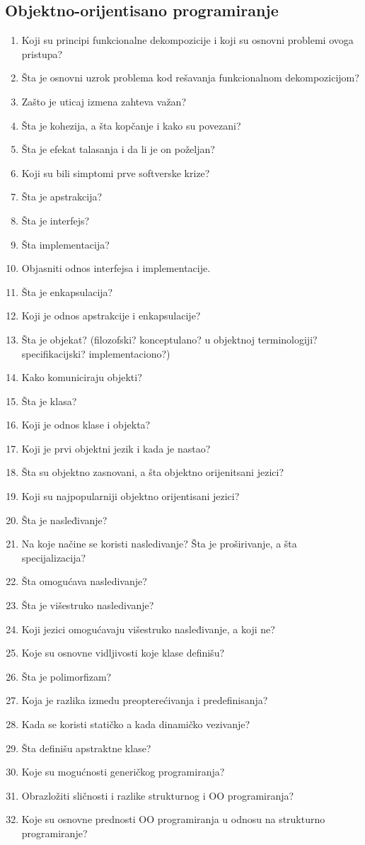 \documentclass[main.tex]{subfiles}
\begin{document}
\begin{multicols}{2}
\subsection{Objektno-orijentisano programiranje}
\begin{enumerate}
\item  Koji su principi funkcionalne dekompozicije i koji su osnovni problemi ovoga pristupa?
\item Šta je osnovni uzrok problema kod rešavanja funkcionalnom dekompozicijom?
\item Zašto je uticaj izmena zahteva važan?
\item Šta je kohezija, a šta kopčanje i kako su povezani?
\item Šta je efekat talasanja i da li je on poželjan?
\item Koji su bili simptomi prve softverske krize?
\item Šta je apstrakcija?
\item Šta je interfejs?
\item Šta implementacija?
\item Objasniti odnos interfejsa i implementacije.
\item Šta je enkapsulacija?
\item Koji je odnos apstrakcije i enkapsulacije?
\item Šta je objekat? (filozofski? konceptulano? u objektnoj terminologiji? specifikacijski? implementaciono?)
\item Kako komuniciraju objekti?
\item Šta je klasa?
\item Koji je odnos klase i objekta?
\item Koji je prvi objektni jezik i kada je nastao?
\item Šta su objektno zasnovani, a šta objektno orijenitsani jezici?
\item Koji su najpopularniji objektno orijentisani jezici?
\item Šta je nasleđivanje?
\item Na koje načine se koristi nasledivanje? Šta je proširivanje, a šta specijalizacija?
\item Šta omogućava nasledivanje?
\item Šta je višestruko nasledivanje?
\item Koji jezici omogućavaju višestruko nasleđivanje, a koji ne?
\item Koje su osnovne vidljivosti koje klase definišu?
\item Šta je polimorfizam?
\item Koja je razlika izmedu preopterećivanja i predefinisanja?
\item Kada se koristi statičko a kada dinamičko vezivanje?
\item Šta definišu apstraktne klase?
\item Koje su mogućnosti generičkog programiranja?
\item Obrazložiti sličnosti i razlike strukturnog i OO programiranja?
\item Koje su osnovne prednosti OO programiranja u odnosu na strukturno programiranje?
\end{enumerate}


\end{multicols}
\end{document}
